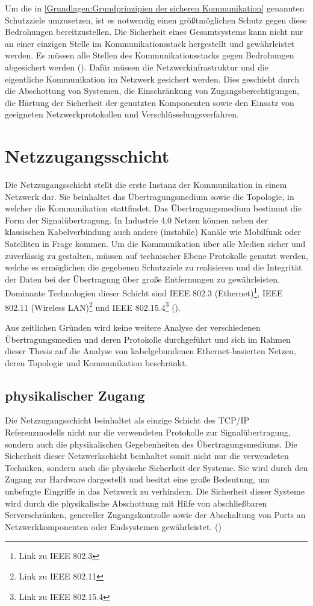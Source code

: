 Um die in \autoref{Grundlagen:Grundprinzipien der sicheren Kommunikation} genannten Schutzziele umzusetzen, ist es notwendig einen größtmöglichen Schutz gegen diese Bedrohungen bereitzustellen. Die Sicherheit eines Gesamtsystems kann nicht nur an einer einzigen Stelle im Kommunikationsstack hergestellt und gewährleistet werden. Es müssen alle Stellen des Kommunikationsstacks gegen Bedrohungen abgesichert werden (\cite{sichKom2017}). Dafür müssen die Netzwerkinfrastruktur und die eigentliche Kommunikation im Netzwerk gesichert werden. Dies geschieht durch die Abschottung von Systemen, die Einschränkung von Zugangsberechtigungen, die Härtung der Sicherheit der genutzten Komponenten sowie den Einsatz von geeigneten Netzwerkprotokollen und Verschlüsselungsverfahren.

\section{Netzzugangsschicht}
Die Netzzugangsschicht stellt die erste Instanz der Kommunikation in einem Netzwerk dar. Sie beinhaltet das Übertragungsmedium sowie die Topologie, in welcher die Kommunikation stattfindet. Das Übertragungsmedium bestimmt die Form der Signalübertragung. In Industrie 4.0 Netzen können neben der klassischen Kabelverbindung auch andere (instabile) Kanäle wie Mobilfunk oder Satelliten in Frage kommen. Um die Kommunikation über alle Medien sicher und zuverlässig zu gestalten, müssen auf technischer Ebene Protokolle genutzt werden, welche es ermöglichen die gegebenen Schutzziele zu realisieren und die Integrität der Daten bei der Übertragung über große Entfernungen zu gewährleisten. Dominante Technologien dieser Schicht sind \ac{IEEE} 802.3 (Ethernet)\footnote{Link zu IEEE 802.3}, \ac{IEEE} 802.11 (Wireless LAN)\footnote{Link zu IEEE 802.11} und \ac{IEEE} 802.15.4\footnote{Link zu IEEE 802.15.4} (\cite{sichKom2017}).

Aus zeitlichen Gründen wird keine weitere Analyse der verschiedenen Übertragungsmedien und deren Protokolle durchgeführt und sich im Rahmen dieser Thesis auf die Analyse von kabelgebundenen Ethernet-basierten Netzen, deren Topologie und Kommunikation beschränkt.

\subsection{physikalischer Zugang}
Die Netzzugangsschicht beinhaltet als einzige Schicht des \ac{TCP}/\ac{IP} Referenzmodells nicht nur die verwendeten Protokolle zur Signalübertragung, sondern auch die physikalischen Gegebenheiten des Übertragungsmediums. Die Sicherheit dieser Netzwerkschicht beinhaltet somit nicht nur die verwendeten Techniken, sondern auch die physische Sicherheit der Systeme. Sie wird durch den Zugang zur Hardware dargestellt und besitzt eine große Bedeutung, um unbefugte Eingriffe in das Netzwerk zu verhindern. Die Sicherheit dieser Systeme wird durch die physikalische Abschottung mit Hilfe von abschließbaren Serverschränken, genereller Zugangskontrolle sowie der Abschaltung von Ports an Netzwerkkomponenten oder Endsystemen gewährleistet. (\cite{sichKom2017})

